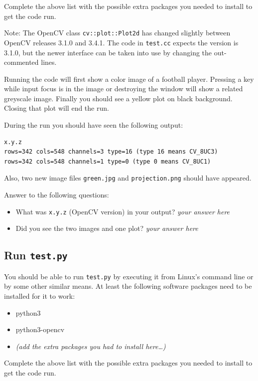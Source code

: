 \documentclass{article}
\begin{document}
Complete the above list with the possible extra packages you needed
to install to get the code run.

Note: The OpenCV class \texttt{cv::plot::Plot2d} has changed slightly
between OpenCV releases 3.1.0 and 3.4.1.  The code in \texttt{test.cc}
expects the version is 3.1.0, but the newer interface can be taken
into use by changing the out-commented lines.

Running the code will first show a color image of a football player.
Pressing a key while input focus is in the image or destroying the
window will show a related greyscale image.  Finally you should see a
yellow plot on black background.  Closing that plot will end the run.

During the run you should have seen the following output:

\begin{verbatim}
x.y.z
rows=342 cols=548 channels=3 type=16 (type 16 means CV_8UC3)
rows=342 cols=548 channels=1 type=0 (type 0 means CV_8UC1)
\end{verbatim}

Also, two new image files \texttt{green.jpg} and
\texttt{projection.png} should have appeared.

Answer to the following questions:

\begin{itemize}
\item What was \texttt{x.y.z} (OpenCV version) in your output? \emph{your answer here} 
\item Did you see the two images and one plot? \emph{your answer here} 
\end{itemize}


\subsection{Run \texttt{test.py}}

You should be able to run \texttt{test.py} by executing it from
Linux's command line or by some other similar means.  At least the
following software packages need to be installed for it to work:

\begin{itemize}
\item python3
\item python3-opencv
\item \emph{(add the extra packages you had to install here\ldots)}
\end{itemize}

Complete the above list with the possible extra packages you needed
to install to get the code run.
\end{document}

